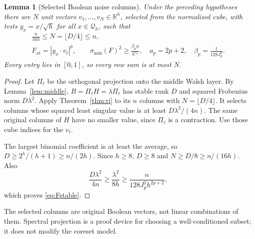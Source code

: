 \documentclass[11pt]{article}
\newtheorem{lemma}[theorem]{Lemma}
\theoremstyle{remark}\newtheorem{remark}[theorem]{Remark}
\newcommand{\R}{\mathbb R}\newcommand{\E}{\mathbb E}\newcommand{\Prob}{\mathbb P}
\begin{document}
\begin{lemma}[Selected Boolean noise columns]\label{lem:noise}
Under the preceding hypotheses there are $N$ unit vectors $v_1,\ldots,v_N\in\R^h$, selected from the normalized cube, with tests $y_x=x/\sqrt h$ for all $x\in\mathcal Q_h$, such that
\begin{gather}
 \frac{n}{16h}\le N=\lfloor D/4\rfloor\le n,\label{eq:N}\\
 F_{xt}=|y_x\cdot v_t|^p,\qquad
 \sigma_{\min}(F)^2\ge \frac{\beta_p n}{h^{a_p}},
 \quad a_p=2p+2,\quad \beta_p=\frac1{128J_p^2}.\label{eq:Fstable}
\end{gather}
Every entry lies in $[0,1]$, so every row sum is at most $N$.
\end{lemma}
\begin{proof}
Let $\Pi_\ell$ be the orthogonal projection onto the middle Walsh layer. By Lemma~\ref{lem:middle},
$B=\Pi_\ell H=\lambda\Pi_\ell$ has stable rank $D$ and squared Frobenius norm $D\lambda^2$. Apply Theorem~\ref{thm:ri} to its $n$ columns with $N=\lfloor D/4\rfloor$. It selects columns whose squared least singular value is at least $D\lambda^2/(4n)$. The same original columns of $H$ have no smaller value, since $\Pi_\ell$ is a contraction. Use those cube indices for the $v_t$.

The largest binomial coefficient is at least the average, so
$D\ge2^h/(h+1)\ge n/(2h)$. Since $h\ge8$, $D\ge8$ and
$N\ge D/8\ge n/(16h)$. Also
\[
 \frac{D\lambda^2}{4n}\ge\frac{\lambda^2}{8h}
 \ge\frac{n}{128J_p^2h^{2p+2}},
\]
which proves \eqref{eq:Fstable}.
\end{proof}
The selected columns are original Boolean vectors, not linear combinations of them. Spectral projection is a proof device for choosing a well-conditioned subset; it does not modify the coreset model.
\end{document}
